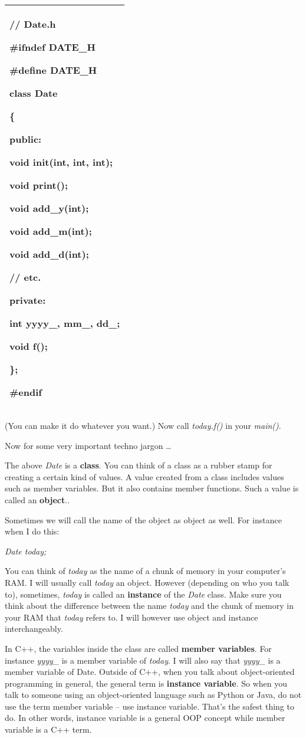\documentclass[
]{article}
\begin{document}
\begin{longtable}[]{@{}l@{}}
\toprule
\endhead
\begin{minipage}[t]{0.97\columnwidth}\raggedright
// Date.h

\#ifndef DATE\_H

\#define DATE\_H

class Date

\{

public:

void init(int, int, int);

void print();

void add\_y(int);

void add\_m(int);

void add\_d(int);

// etc.

private:

int yyyy\_, mm\_, dd\_;

void f();

\};

\#endif\strut
\end{minipage}\tabularnewline
\bottomrule
\end{longtable}

(You can make it do whatever you want.) Now call \emph{today.f()} in
your \emph{main()}.

Now for some very important techno jargon \ldots{}

The above \emph{Date} is a \textbf{class}. You can think of a class as a
rubber stamp for creating a certain kind of values. A value created from
a class includes values such as member variables. But it also contains
member functions. Such a value is called an \textbf{object}..

Sometimes we will call the name of the object as object as well. For
instance when I do this:

\emph{Date today;}

You can think of \emph{today} as the name of a chunk of memory in your
computer's RAM. I will usually call \emph{today} an object. However
(depending on who you talk to), sometimes, \emph{today} is called an
\textbf{instance} of the \emph{Date} class. Make sure you think about
the difference between the name \emph{today} and the chunk of memory in
your RAM that \emph{today} refers to. I will however use object and
instance interchangeably.

In C++, the variables inside the class are called \textbf{member
variables}. For instance \emph{yyyy\_} is a member variable of
\emph{today}. I will also say that \emph{yyyy\_} is a member variable of
Date. Outside of C++, when you talk about object-oriented programming in
general, the general term is \textbf{instance variable}. So when you
talk to someone using an object-oriented language such as Python or
Java, do not use the term member variable -- use instance variable.
That's the safest thing to do. In other words, instance variable is a
general OOP concept while member variable is a C++ term.
\end{document}
